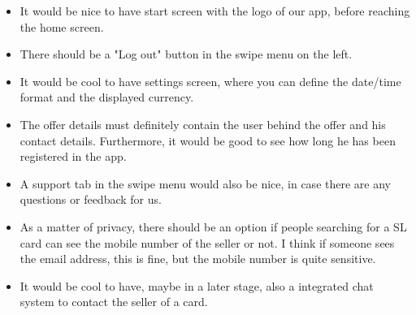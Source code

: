 \documentclass[11pt,twoside,a4paper]{report}
\begin{document}
\begin{itemize}

\item It would be nice to have start screen with the logo of our app, before reaching the home screen.

\item There should be a "Log out" button in the swipe menu on the left.

\item It would be cool to have settings screen, where you can define the date/time format and the displayed currency.

\item The offer details must definitely contain the user behind the offer and his contact details. Furthermore, it would be good to see how long he has been registered in the app.

\item A support tab in the swipe menu would also be nice, in case there are any questions or feedback for us.

\item As a matter of privacy, there should be an option if people searching for a SL card can see the mobile number of the seller or not. I think if someone sees the email address, this is fine, but the mobile number is quite sensitive.

\item It would be cool to have, maybe in a later stage, also a integrated chat system to contact the seller of a card.

\end{itemize}
\end{document}
